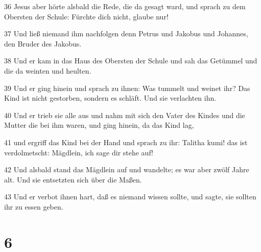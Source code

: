 \par 36 Jesus aber hörte alsbald die Rede, die da gesagt ward, und sprach zu dem Obersten der Schule: Fürchte dich nicht, glaube nur!
\par 37 Und ließ niemand ihm nachfolgen denn Petrus und Jakobus und Johannes, den Bruder des Jakobus.
\par 38 Und er kam in das Haus des Obersten der Schule und sah das Getümmel und die da weinten und heulten.
\par 39 Und er ging hinein und sprach zu ihnen: Was tummelt und weinet ihr? Das Kind ist nicht gestorben, sondern es schläft. Und sie verlachten ihn.
\par 40 Und er trieb sie alle aus und nahm mit sich den Vater des Kindes und die Mutter die bei ihm waren, und ging hinein, da das Kind lag,
\par 41 und ergriff das Kind bei der Hand und sprach zu ihr: Talitha kumi! das ist verdolmetscht: Mägdlein, ich sage dir stehe auf!
\par 42 Und alsbald stand das Mägdlein auf und wandelte; es war aber zwölf Jahre alt. Und sie entsetzten sich über die Maßen.
\par 43 Und er verbot ihnen hart, daß es niemand wissen sollte, und sagte, sie sollten ihr zu essen geben.

\chapter{6}

